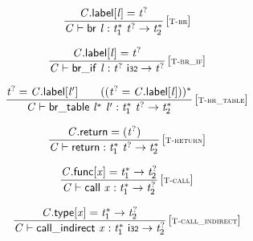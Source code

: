 \vspace{1ex}

$$
\begin{array}{@{}c@{}}\displaystyle
\frac{
{\mathit{C}}.\mathsf{label}[{\mathit{l}}] = {{\mathit{t}}^?}
}{
{\mathit{C}} \vdash \mathsf{br}~{\mathit{l}} : {{\mathit{t}}_{{1}}^\ast}~{{\mathit{t}}^?} \rightarrow {{\mathit{t}}_{{2}}^\ast}
} \, {[\textsc{\scriptsize T{-}br}]}
\qquad
\end{array}
$$

$$
\begin{array}{@{}c@{}}\displaystyle
\frac{
{\mathit{C}}.\mathsf{label}[{\mathit{l}}] = {{\mathit{t}}^?}
}{
{\mathit{C}} \vdash \mathsf{br\_if}~{\mathit{l}} : {{\mathit{t}}^?}~\mathsf{i{\scriptstyle32}} \rightarrow {{\mathit{t}}^?}
} \, {[\textsc{\scriptsize T{-}br\_if}]}
\qquad
\end{array}
$$

$$
\begin{array}{@{}c@{}}\displaystyle
\frac{
{{\mathit{t}}^?} = {\mathit{C}}.\mathsf{label}[{\mathit{l}'}]
 \qquad
(({{\mathit{t}}^?} = {\mathit{C}}.\mathsf{label}[{\mathit{l}}]))^\ast
}{
{\mathit{C}} \vdash \mathsf{br\_table}~{{\mathit{l}}^\ast}~{\mathit{l}'} : {{\mathit{t}}_{{1}}^\ast}~{{\mathit{t}}^?} \rightarrow {{\mathit{t}}_{{2}}^\ast}
} \, {[\textsc{\scriptsize T{-}br\_table}]}
\qquad
\end{array}
$$

\vspace{1ex}

$$
\begin{array}{@{}c@{}}\displaystyle
\frac{
{\mathit{C}}.\mathsf{return} = ({{\mathit{t}}^?})
}{
{\mathit{C}} \vdash \mathsf{return} : {{\mathit{t}}_{{1}}^\ast}~{{\mathit{t}}^?} \rightarrow {{\mathit{t}}_{{2}}^\ast}
} \, {[\textsc{\scriptsize T{-}return}]}
\qquad
\end{array}
$$

$$
\begin{array}{@{}c@{}}\displaystyle
\frac{
{\mathit{C}}.\mathsf{func}[{\mathit{x}}] = {{\mathit{t}}_{{1}}^\ast} \rightarrow {{\mathit{t}}_{{2}}^?}
}{
{\mathit{C}} \vdash \mathsf{call}~{\mathit{x}} : {{\mathit{t}}_{{1}}^\ast} \rightarrow {{\mathit{t}}_{{2}}^?}
} \, {[\textsc{\scriptsize T{-}call}]}
\qquad
\end{array}
$$

$$
\begin{array}{@{}c@{}}\displaystyle
\frac{
{\mathit{C}}.\mathsf{type}[{\mathit{x}}] = {{\mathit{t}}_{{1}}^\ast} \rightarrow {{\mathit{t}}_{{2}}^?}
}{
{\mathit{C}} \vdash \mathsf{call\_indirect}~{\mathit{x}} : {{\mathit{t}}_{{1}}^\ast}~\mathsf{i{\scriptstyle32}} \rightarrow {{\mathit{t}}_{{2}}^?}
} \, {[\textsc{\scriptsize T{-}call\_indirect}]}
\qquad
\end{array}
$$

